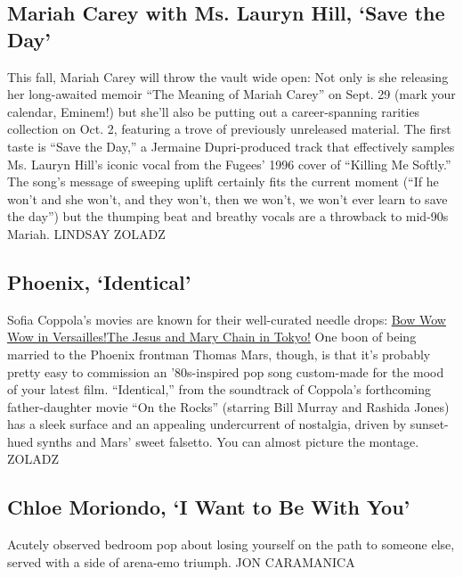 \hypertarget{mariah-carey-with-ms-lauryn-hill-save-the-day}{%
\subsection{Mariah Carey with Ms. Lauryn Hill, `Save the
Day'}\label{mariah-carey-with-ms-lauryn-hill-save-the-day}}

This fall, Mariah Carey will throw the vault wide open: Not only is she
releasing her long-awaited memoir ``The Meaning of Mariah Carey'' on
Sept. 29 (mark your calendar, Eminem!) but she'll also be putting out a
career-spanning rarities collection on Oct. 2, featuring a trove of
previously unreleased material. The first taste is ``Save the Day,'' a
Jermaine Dupri-produced track that effectively samples Ms. Lauryn Hill's
iconic vocal from the Fugees' 1996 cover of ``Killing Me Softly.'' The
song's message of sweeping uplift certainly fits the current moment
(``If he won't and she won't, and they won't, then we won't, we won't
ever learn to save the day'') but the thumping beat and breathy vocals
are a throwback to mid-90s Mariah. LINDSAY ZOLADZ

\hypertarget{phoenix-identical}{%
\subsection{Phoenix, `Identical'}\label{phoenix-identical}}

Sofia Coppola's movies are known for their well-curated needle drops:
\href{https://www.youtube.com/watch?v=OZByH4Wai_I}{Bow Wow Wow in
Versailles!}\href{https://www.youtube.com/watch?v=dPly3e12ca8}{The Jesus
and Mary Chain in Tokyo!} One boon of being married to the Phoenix
frontman Thomas Mars, though, is that it's probably pretty easy to
commission an '80s-inspired pop song custom-made for the mood of your
latest film. ``Identical,'' from the soundtrack of Coppola's forthcoming
father-daughter movie ``On the Rocks'' (starring Bill Murray and Rashida
Jones) has a sleek surface and an appealing undercurrent of nostalgia,
driven by sunset-hued synths and Mars' sweet falsetto. You can almost
picture the montage. ZOLADZ

\hypertarget{chloe-moriondo-i-want-to-be-with-you}{%
\subsection{Chloe Moriondo, `I Want to Be With
You'}\label{chloe-moriondo-i-want-to-be-with-you}}

Acutely observed bedroom pop about losing yourself on the path to
someone else, served with a side of arena-emo triumph. JON CARAMANICA

